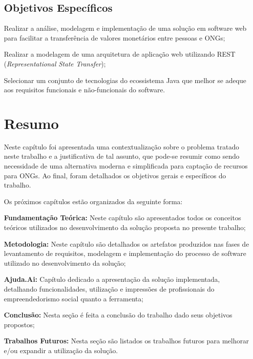 \subsection{Objetivos Específicos}
\begin{lista}
  \item Realizar a análise, modelagem e implementação de uma solução em software web para facilitar a transferência de valores monetários entre pessoas e ONGs;
  \item Realizar a modelagem de uma arquitetura de aplicação web utilizando REST (\emph{Representational State Transfer});
  \item Selecionar um conjunto de tecnologias do ecossistema Java que melhor se adeque aos requisitos funcionais e não-funcionais do software.
\end{lista}



\section*{Resumo}
Neste capítulo foi apresentada uma contextualização sobre o problema tratado neste trabalho e a justificativa de tal assunto, que pode-se resumir como sendo necessidade de uma alternativa moderna e simplificada para captação de recursos para ONGs. Ao final, foram detalhados os objetivos gerais e específicos do trabalho.

Os próximos capítulos estão organizados da seguinte forma:

\begin{lista}
  \item \textbf{Fundamentação Teórica:} Neste capítulo são apresentados todos os conceitos teóricos utilizados no desenvolvimento da solução proposta no presente trabalho;
  \item \textbf{Metodologia:} Neste capítulo são detalhados os artefatos produzidos nas fases de levantamento de requisitos, modelagem e implementação do processo de software utilizado no desenvolvimento da solução;
  \item \textbf{Ajuda.Ai:} Capítulo dedicado a apresentação da solução implementada, detalhando funcionalidades, utilização e impressões de profissionais do empreendedorismo social quanto a ferramenta;
  \item \textbf{Conclusão:} Nesta seção é feita a conclusão do trabalho dado seus objetivos propostos;
  \item \textbf{Trabalhos Futuros:} Nesta seção são listados os trabalhos futuros para melhorar e/ou expandir a utilização da solução.
\end{lista}
